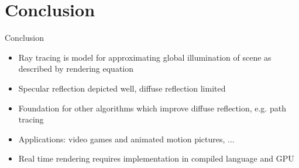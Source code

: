 \section{Conclusion}

\begin{frame}{Conclusion}
\begin{itemize}
    \item Ray tracing is model for approximating global illumination of scene as described by rendering equation
    \item Specular reflection depicted well, diffuse reflection limited
    \item Foundation for other algorithms which improve diffuse reflection, e.g. path tracing
    \item Applications: video games and animated motion pictures, ...
    \item Real time rendering requires implementation in compiled
    language and GPU
\end{itemize}
\end{frame}